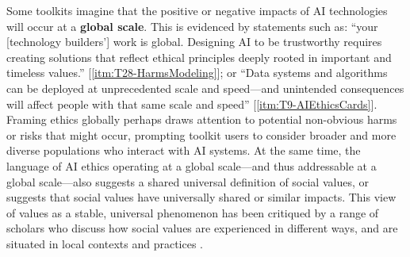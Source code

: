 \documentclass[acmsmall]{acmart}
\begin{document}
Some toolkits imagine that the positive or negative impacts of AI technologies will occur at a \textbf{global scale}. This is evidenced by statements such as: ``your [technology builders'] work is global. Designing AI to be trustworthy requires creating solutions that reflect ethical principles deeply rooted in important and timeless values.''  [\ref{itm:T28-HarmsModeling}]; or ``Data systems and algorithms can be deployed at unprecedented scale and speed—and unintended consequences will affect people with that same scale and speed'' [\ref{itm:T9-AIEthicsCards}].
Framing ethics globally perhaps draws attention to potential non-obvious harms or risks that might occur, prompting toolkit users to consider broader and more diverse populations who interact with AI systems. At the same time, the language of AI ethics operating at a global scale---and thus addressable at a global scale---also suggests a shared universal definition of social values, or suggests that social values have universally shared or similar impacts. This view of values as a stable, universal phenomenon has been critiqued by a range of scholars who discuss how social values are experienced in different ways, and are situated in local contexts and practices \cite{LeDantec2009Values,Houston2016Values,JafariNaimi2015ValuesHypotheses,Shilton2014HowToSeeValues,sambasivan2021reimagining,madaio2022assessing}.
\end{document}
